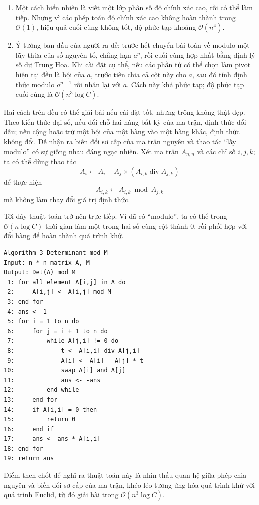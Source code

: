 \documentclass[11pt]{article}
\newcommand{\Oh}{\mathcal{O}}
\begin{document}
\begin{enumerate}
  \item Một cách hiển nhiên là viết một lớp phân số độ chính xác cao, rồi có
  thể làm tiếp. Nhưng vì các phép toán độ chính xác cao không hoàn thành trong
  $\Oh(1)$, hiệu quả cuối cùng không tốt, độ phức tạp khoảng $\Oh(n^4)$.

  \item Ý tưởng ban đầu của người ra đề: trước hết chuyển bài toán về modulo
  một lũy thừa của số nguyên tố, chẳng hạn $a^p$, rồi cuối cùng hợp nhất bằng
  định lý số dư Trung Hoa. Khi cài đặt cụ thể, nếu các phần tử có thể chọn làm
  pivot hiện tại đều là bội của $a$, trước tiên chia cả cột này cho $a$, sau
  đó tính định thức modulo $a^{p-1}$ rồi nhân lại với $a$. Cách này khá phức
  tạp; độ phức tạp cuối cùng là $\Oh(n^3\log C)$.
\end{enumerate}

Hai cách trên đều có thể giải bài nếu cài đặt tốt, nhưng trông không thật đẹp.
Theo kiến thức đại số, nếu đổi chỗ hai hàng bất kỳ của ma trận, định thức đổi
dấu; nếu cộng hoặc trừ một bội của một hàng vào một hàng khác, định thức không
đổi. Dễ nhận ra biến đổi sơ cấp của ma trận nguyên và thao tác ``lấy modulo''
có sự giống nhau đáng ngạc nhiên. Xét ma trận $A_{n,n}$ và các chỉ số $i,j,k$;
ta có thể dùng thao tác
\[
  A_i\gets A_i-A_j\times (A_{i,k}\operatorname{div} A_{j,k})
\]
để thực hiện
\[
  A_{i,k}\gets A_{i,k}\bmod A_{j,k}
\]
mà không làm thay đổi giá trị định thức.

Tới đây thuật toán trở nên trực tiếp. Vì đã có ``modulo'', ta có thể trong
$\Oh(n\log C)$ thời gian làm một trong hai số cùng cột thành $0$, rồi phối hợp
với đổi hàng để hoàn thành quá trình khử.

\begin{verbatim}
Algorithm 3 Determinant mod M
Input: n * n matrix A, M
Output: Det(A) mod M
 1: for all element A[i,j] in A do
 2:     A[i,j] <- A[i,j] mod M
 3: end for
 4: ans <- 1
 5: for i = 1 to n do
 6:     for j = i + 1 to n do
 7:         while A[j,i] != 0 do
 8:             t <- A[i,i] div A[j,i]
 9:             A[i] <- A[i] - A[j] * t
10:             swap A[i] and A[j]
11:             ans <- -ans
12:         end while
13:     end for
14:     if A[i,i] = 0 then
15:         return 0
16:     end if
17:     ans <- ans * A[i,i]
18: end for
19: return ans
\end{verbatim}

Điểm then chốt để nghĩ ra thuật toán này là nhìn thấu quan hệ giữa phép chia
nguyên và biến đổi sơ cấp của ma trận, khéo léo tương ứng hóa quá trình khử
với quá trình Euclid, từ đó giải bài trong $\Oh(n^3\log C)$.
\end{document}
